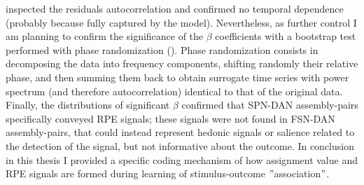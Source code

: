 inspected the residuals autocorrelation and confirmed no temporal dependence (probably because fully captured by the model). Nevertheless, as further control I am planning to confirm the significance of the $\beta$ coefficients with a bootstrap test performed with phase randomization (\cite{Mokeichev}). Phase randomization consists in decomposing the data into frequency components, shifting randomly their relative phase, and then summing them back to obtain surrogate time series with power spectrum (and therefore autocorrelation) identical to that of the original data.\\Finally, the  distributions of significant $\beta$ confirmed that SPN-DAN assembly-pairs specifically conveyed RPE signals; these signals were not found in FSN-DAN assembly-pairs, that could instead represent hedonic signals or salience related to the detection of the signal, but not informative about the outcome. In conclusion in this thesis I provided a specific coding mechanism of how assignment value and RPE signals are formed during learning of stimulus-outcome $"$association$"$.\\\\
